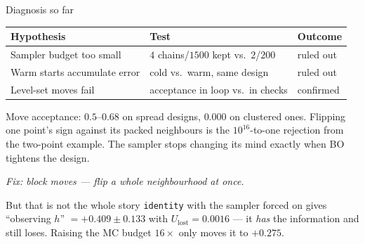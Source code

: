 \documentclass[aspectratio=169,11pt]{beamer}
\newcommand{\Ulost}{U_{\text{lost}}}
\newcommand{\good}{\textcolor{green!50!black}}
\begin{document}
\begin{frame}[shrink=5]{Diagnosis so far}

\begin{center}
\begin{tabular}{lll}
\toprule
Hypothesis & Test & Outcome \\
\midrule
Sampler budget too small & $4$ chains/$1500$ kept vs.\ $2$/$200$ & \good{ruled out} \\
Warm starts accumulate error & cold vs.\ warm, same design & \good{ruled out} \\
Level-set moves fail & acceptance in loop vs.\ in checks & \alert{confirmed} \\
\bottomrule
\end{tabular}
\end{center}

\bigskip
Move acceptance: $0.5$--$0.68$ on spread designs, \textbf{$0.000$} on clustered
ones. Flipping one point's sign against its packed neighbours is the
$10^{16}$-to-one rejection from the two-point example. The sampler stops changing its mind
exactly when BO tightens the design.

\medskip
\emph{Fix: block moves --- flip a whole neighbourhood at once.}

\bigskip
\begin{alertblock}{But that is not the whole story}
\texttt{identity} with the sampler forced on gives ``observing $h$''
$=+0.409\pm0.133$ with $\Ulost=0.0016$ --- it \emph{has} the information and
still loses. Raising the MC budget $16\times$ only moves it to $+0.275$.
\end{alertblock}

\end{frame}
\end{document}
